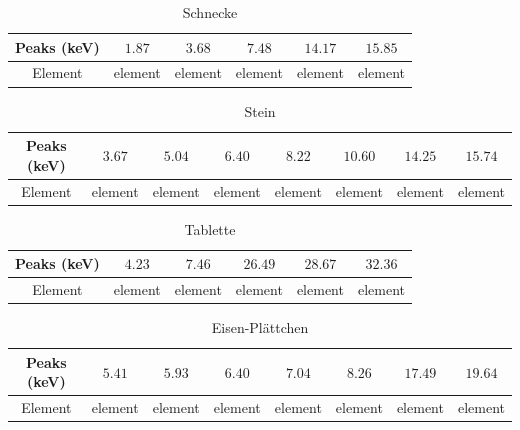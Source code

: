 \documentclass[a4paper,14pt]{article}
\begin{document}
\begin{table}[H]
	\renewcommand{\arraystretch}{1}
	\centering
	\Large
	\begin{adjustbox}{width=\textwidth}
		\begin{tabular}{|c|c|c|c|c|c|}
			\hline
			Peaks (keV) & $1.87$ & $3.68$ & $7.48$ & $14.17$ & $15.85$ \\
			\hline
			Element & element & element & element & element & element \\
			\hline
		\end{tabular}
	\end{adjustbox}
	\caption{ Schnecke }
	\label{tab: }
\end{table}
\begin{table}[H]
	\renewcommand{\arraystretch}{1}
	\centering
	\Large
	\begin{adjustbox}{width=\textwidth}
		\begin{tabular}{|c|c|c|c|c|c|c|c|}
			\hline
			Peaks (keV) & $3.67$ & $5.04$ & $6.40$ & $8.22$ & $10.60$ & $14.25$ & $15.74$ \\
			\hline
			Element & element & element & element & element & element & element & element \\
			\hline
		\end{tabular}
	\end{adjustbox}
	\caption{ Stein }
	\label{tab: }
\end{table}
\begin{table}[H]
	\renewcommand{\arraystretch}{1}
	\centering
	\Large
	\begin{adjustbox}{width=\textwidth}
		\begin{tabular}{|c|c|c|c|c|c|}
			\hline
			Peaks (keV) & $4.23$ & $7.46$ & $26.49$ & $28.67$ & $32.36$ \\
			\hline
			Element & element & element & element & element & element \\
			\hline
		\end{tabular}
	\end{adjustbox}
	\caption{ Tablette }
	\label{tab: }
\end{table}
\begin{table}[H]
	\renewcommand{\arraystretch}{1}
	\centering
	\Large
	\begin{adjustbox}{width=\textwidth}
		\begin{tabular}{|c|c|c|c|c|c|c|c|}
			\hline
			Peaks (keV) & $5.41$ & $5.93$ & $6.40$ & $7.04$ & $8.26$ & $17.49$ & $19.64$ \\
			\hline
			Element & element & element & element & element & element & element & element \\
			\hline
		\end{tabular}
	\end{adjustbox}
	\caption{ Eisen-Pl\"attchen }
	\label{tab: }
\end{table}
\end{document}
